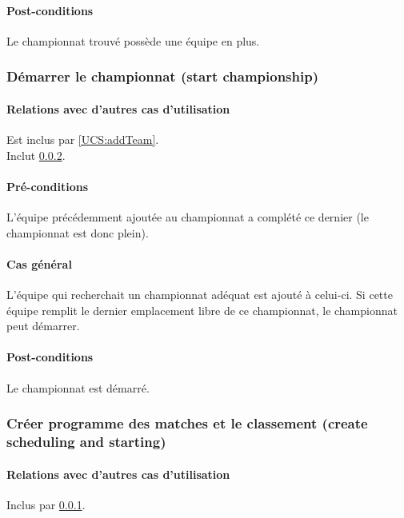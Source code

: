 \paragraph{Post-conditions}
\begin{list}{}{\leftmargin=1.5em}
\item{Le championnat trouvé possède une équipe en plus.}
\end{list}

\subsubsection{Démarrer le championnat (start championship)}
\label{UCS:startChampionship}
\paragraph{Relations avec d'autres cas d'utilisation}
Est inclus par \ref{UCS:addTeam}.\\
Inclut \ref{UCS:createST}.
\paragraph{Pré-conditions}
\begin{list}{}{\leftmargin=1.5em}
\item{L'équipe précédemment ajoutée au championnat a complété ce dernier (le championnat est donc plein).}
\end{list}
\paragraph{Cas général}
L'équipe qui recherchait un championnat adéquat est ajouté à celui-ci. Si cette équipe remplit le dernier emplacement libre de ce championnat, le championnat peut démarrer.
\paragraph{Post-conditions}
\begin{list}{}{\leftmargin=1.5em}
\item{Le championnat est démarré.}
\end{list}

\subsubsection{Créer programme des matches et le classement (create scheduling and starting)}
\label{UCS:createST}
\paragraph{Relations avec d'autres cas d'utilisation}
Inclus par \ref{UCS:startChampionship}.
